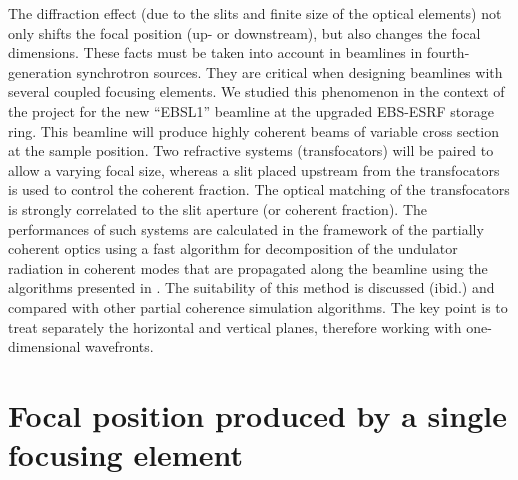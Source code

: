 \documentclass[doublecol]{epl2}
\newcommand{\inred}[1]{{\color{black}#1}} %
\begin{document}
The diffraction effect (due to the slits and finite size of the optical elements) not only shifts the focal position (up- or downstream), but also changes the focal dimensions. These facts must be taken into account in beamlines in fourth-generation synchrotron sources. They are critical when designing beamlines with several coupled focusing elements. We studied this phenomenon in the context of the project for the new ``EBSL1'' beamline at the upgraded EBS-ESRF storage ring. This beamline will produce highly coherent beams of variable cross section at the sample position. Two refractive systems (transfocators) will be paired to allow a varying focal size, whereas a slit placed upstream from the transfocators is used to control the coherent fraction. The optical matching of the transfocators is strongly correlated to the slit aperture (or coherent fraction). The performances of such systems are calculated in the framework of the partially coherent optics using a fast algorithm for decomposition of the undulator radiation in coherent modes that are propagated along the beamline using the algorithms presented in \cite{multioptics}. The \inred{suitability} of this method is discussed (ibid.) and compared with other partial coherence simulation algorithms. The key point is to treat separately the horizontal and vertical planes, therefore working with one-dimensional wavefronts.




\section{Focal position produced by a single focusing element}
\label{sec:onelens}
\end{document}
